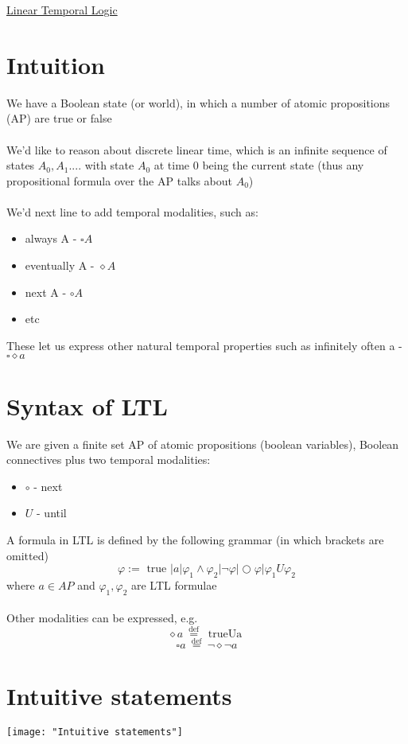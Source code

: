 \documentclass{article}[18pt]
\begin{document}
\begin{center}
\underline{\huge Linear Temporal Logic}
\end{center}
\section{Intuition}
We have a Boolean state (or world), in which a number of atomic propositions (AP) are true or false\\
\\
We'd like to reason about discrete linear time, which is an infinite sequence of states $A_0,A_1....$ with state $A_0$ at time 0 being the current state (thus any propositional formula over the AP talks about $A_0$)\\
\\
We'd next line to add temporal modalities, such as:
\begin{itemize}
	\item always A - $\square A$
	\item eventually A - $\diamond A$
	\item next A - $\circ A$
	\item etc
\end{itemize}
These let us express other natural temporal properties such as infinitely often a - $\square\diamond a$
\section{Syntax of LTL}
We are given a finite set AP of atomic propositions (boolean variables), Boolean connectives plus two temporal modalities:
\begin{itemize}
	\item $\circ$ - next
	\item $U$ - until
\end{itemize}
A formula in LTL is defined by the following grammar (in which brackets are omitted)
\[
\varphi:=\text { true }|a| \varphi_{1} \wedge \varphi_{2}|\neg \varphi| \bigcirc \varphi | \varphi_{1} U \varphi_{2}
\]
where $a\in AP$ and $\varphi_1,\varphi_2$ are LTL formulae\\
\\
Other modalities can be expressed, e.g.
\[
\diamond a \stackrel{\text { def }}{=} \text { trueUa }
\]
\[
\square a \stackrel{\text { def }}{=} \neg \diamond \neg a
\]
\section{Intuitive statements}
\begin{center}
	\texttt{[image: "Intuitive statements"]}
\end{center}
\end{document}
